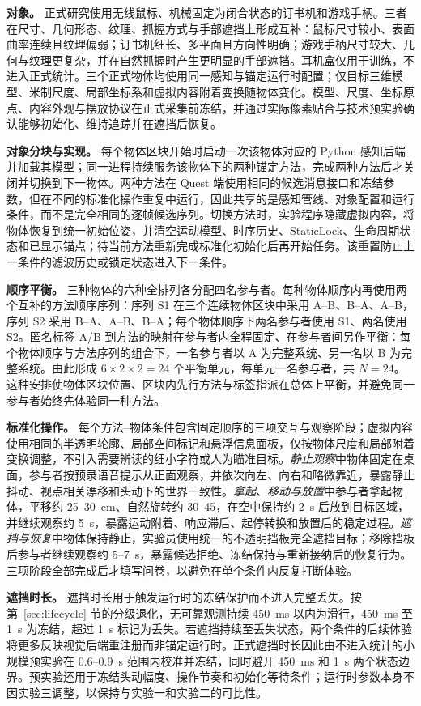 \documentclass[review]{vgtc}
\begin{document}
\textbf{对象。} 正式研究使用无线鼠标、机械固定为闭合状态的订书机和游戏手柄。三者在尺寸、几何形态、纹理、抓握方式与手部遮挡上形成互补：鼠标尺寸较小、表面曲率连续且纹理偏弱；订书机细长、多平面且方向性明确；游戏手柄尺寸较大、几何与纹理更复杂，并在自然抓握时产生更明显的手部遮挡。耳机盒仅用于训练，不进入正式统计。三个正式物体均使用同一感知与锚定运行时配置；仅目标三维模型、米制尺度、局部坐标系和虚拟内容附着变换随物体变化。模型、尺度、坐标原点、内容外观与摆放协议在正式采集前冻结，并通过实际像素贴合与技术预实验确认能够初始化、维持追踪并在遮挡后恢复。

\textbf{对象分块与实现。} 每个物体区块开始时启动一次该物体对应的 Python 感知后端并加载其模型；同一进程持续服务该物体下的两种锚定方法，完成两种方法后才关闭并切换到下一物体。两种方法在 Quest 端使用相同的候选消息接口和冻结参数，但在不同的标准化操作重复中运行，因此共享的是感知管线、对象配置和运行条件，而不是完全相同的逐帧候选序列。切换方法时，实验程序隐藏虚拟内容，将物体恢复到统一初始位姿，并清空运动模型、时序历史、StaticLock、生命周期状态和已显示锚点；待当前方法重新完成标准化初始化后再开始任务。该重置防止上一条件的滤波历史或锁定状态进入下一条件。

\textbf{顺序平衡。} 三种物体的六种全排列各分配四名参与者。每种物体顺序内再使用两个互补的方法顺序序列：序列 S1 在三个连续物体区块中采用 A--B、B--A、A--B，序列 S2 采用 B--A、A--B、B--A；每个物体顺序下两名参与者使用 S1、两名使用 S2。匿名标签 A/B 到方法的映射在参与者内全程固定、在参与者间另作平衡：每个物体顺序与方法序列的组合下，一名参与者以 A 为完整系统、另一名以 B 为完整系统。由此形成 $6 \times 2 \times 2=24$ 个平衡单元，每单元一名参与者，共 $N=24$。这种安排使物体区块位置、区块内先行方法与标签指派在总体上平衡，并避免同一参与者始终先体验同一种方法。

\textbf{标准化操作。} 每个方法--物体条件包含固定顺序的三项交互与观察阶段；虚拟内容使用相同的半透明轮廓、局部空间标记和悬浮信息面板，仅按物体尺度和局部附着变换调整，不引入需要辨读的细小字符或人为瞄准目标。\emph{静止观察}中物体固定在桌面，参与者按预录语音提示从正面观察，并依次向左、向右和略微靠近，暴露静止抖动、视点相关漂移和头动下的世界一致性。\emph{拿起、移动与放置}中参与者拿起物体，平移约 25--30~cm、自然旋转约 30--45\textdegree{}，在空中保持约 2~s 后放到目标区域，并继续观察约 5~s，暴露运动附着、响应滞后、起停转换和放置后的稳定过程。\emph{遮挡与恢复}中物体保持静止，实验员使用统一的不透明挡板完全遮挡目标；移除挡板后参与者继续观察约 5--7~s，暴露候选拒绝、冻结保持与重新接纳后的恢复行为。三项阶段全部完成后才填写问卷，以避免在单个条件内反复打断体验。

\textbf{遮挡时长。} 遮挡时长用于触发运行时的冻结保护而不进入完整丢失。按第~\ref{sec:lifecycle} 节的分级退化，无可靠观测持续 450~ms 以内为滑行，450~ms 至 1~s 为冻结，超过 1~s 标记为丢失。若遮挡持续至丢失状态，两个条件的后续体验将更多反映视觉后端重注册而非锚定运行时。正式遮挡时长因此由不进入统计的小规模预实验在 0.6--0.9~s 范围内校准并冻结，同时避开 450~ms 和 1~s 两个状态边界。预实验还用于冻结头动幅度、操作节奏和初始化等待条件；运行时参数本身不因实验三调整，以保持与实验一和实验二的可比性。
\end{document}
